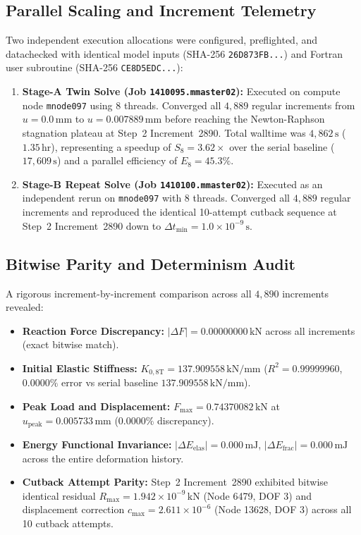 \subsection{Parallel Scaling and Increment Telemetry}
Two independent execution allocations were configured, preflighted, and datachecked with identical model inputs (SHA-256 \texttt{26D873FB...}) and Fortran user subroutine (SHA-256 \texttt{CE8D5EDC...}):
\begin{enumerate}
  \item \textbf{Stage-A Twin Solve (Job \texttt{1410095.mmaster02}):} Executed on compute node \texttt{mnode097} using 8 threads. Converged all $4{,}889$ regular increments from $u = 0.0\,\mathrm{mm}$ to $u = 0.007889\,\mathrm{mm}$ before reaching the Newton-Raphson stagnation plateau at Step~2 Increment~2890. Total walltime was $4{,}862\,\mathrm{s}$ ($1.35\,\mathrm{hr}$), representing a speedup of $S_8 = \mathbf{3.62\times}$ over the serial baseline ($17{,}609\,\mathrm{s}$) and a parallel efficiency of $E_8 = \mathbf{45.3\%}$.
  \item \textbf{Stage-B Repeat Solve (Job \texttt{1410100.mmaster02}):} Executed as an independent rerun on \texttt{mnode097} with 8 threads. Converged all $4{,}889$ regular increments and reproduced the identical 10-attempt cutback sequence at Step~2 Increment~2890 down to $\Delta t_{\min} = 1.0\times 10^{-9}\,\mathrm{s}$.
\end{enumerate}

\subsection{Bitwise Parity and Determinism Audit}
A rigorous increment-by-increment comparison across all $4{,}890$ increments revealed:
\begin{itemize}
  \item \textbf{Reaction Force Discrepancy:} $|\Delta F| = 0.00000000\,\mathrm{kN}$ across all increments (exact bitwise match).
  \item \textbf{Initial Elastic Stiffness:} $K_{0,\mathrm{8T}} = 137.909558\,\mathrm{kN/mm}$ ($R^2 = 0.99999960$, $0.0000\%$ error vs serial baseline $137.909558\,\mathrm{kN/mm}$).
  \item \textbf{Peak Load and Displacement:} $F_{\max} = 0.74370082\,\mathrm{kN}$ at $u_{\mathrm{peak}} = 0.005733\,\mathrm{mm}$ ($0.0000\%$ discrepancy).
  \item \textbf{Energy Functional Invariance:} $|\Delta E_{\mathrm{elas}}| = 0.000\,\mathrm{mJ}$, $|\Delta E_{\mathrm{frac}}| = 0.000\,\mathrm{mJ}$ across the entire deformation history.
  \item \textbf{Cutback Attempt Parity:} Step~2 Increment~2890 exhibited bitwise identical residual $R_{\max} = 1.942\times 10^{-9}\,\mathrm{kN}$ (Node 6479, DOF 3) and displacement correction $c_{\max} = 2.611\times 10^{-6}$ (Node 13628, DOF 3) across all 10 cutback attempts.
\end{itemize}

